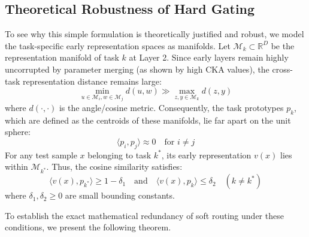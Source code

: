 \documentclass{article}
\theoremstyle{plain}
\theoremstyle{definition}
\theoremstyle{remark}
\begin{document}
\subsection{Theoretical Robustness of Hard Gating}
To see why this simple formulation is theoretically justified and robust, we model the task-specific early representation spaces as manifolds. Let $\mathcal{M}_k \subset \mathbb{R}^D$ be the representation manifold of task $k$ at Layer 2. Since early layers remain highly uncorrupted by parameter merging (as shown by high CKA values), the cross-task representation distance remains large:
\begin{equation}
\min_{u \in \mathcal{M}_i, w \in \mathcal{M}_j} d(u, w) \gg \max_{z, y \in \mathcal{M}_k} d(z, y)
\end{equation}
where $d(\cdot, \cdot)$ is the angle/cosine metric. Consequently, the task prototypes $p_k$, which are defined as the centroids of these manifolds, lie far apart on the unit sphere:
\begin{equation}
\langle p_i, p_j \rangle \approx 0 \quad \text{for } i \neq j
\end{equation}
For any test sample $x$ belonging to task $k^*$, its early representation $v(x)$ lies within $\mathcal{M}_{k^*}$. Thus, the cosine similarity satisfies:
\begin{equation}
\langle v(x), p_{k^*} \rangle \ge 1 - \delta_1 \quad \text{and} \quad \langle v(x), p_{k} \rangle \le \delta_2 \quad (k \neq k^*)
\end{equation}
where $\delta_1, \delta_2 \ge 0$ are small bounding constants.

To establish the exact mathematical redundancy of soft routing under these conditions, we present the following theorem.
\end{document}
